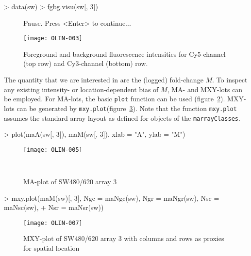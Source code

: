\documentclass[a4paper,11pt]{article}
\begin{document}
\begin{Schunk}
\begin{Sinput}
> data(sw)
> fgbg.visu(sw[, 3])
\end{Sinput}
\end{Schunk}

\begin{figure}
\centering
\begin{Schunk}
\begin{Soutput}
Pause. Press <Enter> to continue...
\end{Soutput}
\end{Schunk}
\texttt{[image: OLIN-003]}
\caption{Foreground and background fluorescence intensities for Cy5-channel (top row) and Cy3-channel (bottom) row.}
\label{fgbg}
\end{figure}

The  quantity that we are interested in are the (logged) fold-change $M$. To inspect
any existing intensity- or location-dependent bias of $M$, MA- and MXY-lots can be employed.
For MA-lots, the basic \texttt{plot} function can be used (figure~\ref{maplot}). 
MXY-lots can be generated 
by \texttt{mxy.plot}(figure~\ref{mxyplot}). 
Note that the function   \texttt{mxy.plot} assumes the standard array
layout as defined for objects of the \texttt{marrayClasses}.
  
\begin{Schunk}
\begin{Sinput}
> plot(maA(sw[, 3]), maM(sw[, 3]), xlab = "A", ylab = "M")
\end{Sinput}
\end{Schunk}

\begin{figure}[t]
\centering
\texttt{[image: OLIN-005]}
\caption{MA-plot of SW480/620 array 3}\
\label{maplot}
\end{figure}


\begin{Schunk}
\begin{Sinput}
> mxy.plot(maM(sw)[, 3], Ngc = maNgc(sw), Ngr = maNgr(sw), Nsc = maNsc(sw), 
+     Nsr = maNsr(sw))
\end{Sinput}
\end{Schunk}

\begin{figure}
\centering
\texttt{[image: OLIN-007]}
\caption{MXY-plot of SW480/620 array 3 with columns and rows as proxies for spatial location}
\label{mxyplot}
\end{figure}
\end{document}
